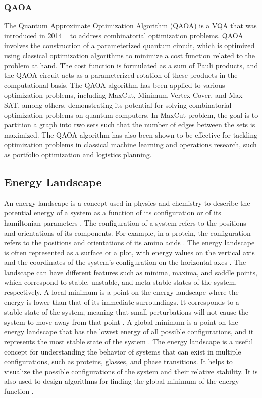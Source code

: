 \subsubsection{QAOA}
The Quantum Approximate Optimization Algorithm (QAOA) is a VQA that was introduced in 2014 ~\cite{farhi2014quantum} to address combinatorial optimization problems.
QAOA involves the construction of a parameterized quantum circuit, which is optimized using
classical optimization algorithms to minimize a cost function related to the problem at hand.
The cost function is formulated as a sum of Pauli products, and the QAOA circuit acts as a parameterized
rotation of these products in the computational basis. The QAOA algorithm has been applied to various
optimization problems, including MaxCut, Minimum Vertex Cover, and Max-SAT, among others, demonstrating
its potential for solving combinatorial optimization problems on quantum computers.
In MaxCut problem, the goal is to partition a graph into
two sets such that the number of edges between the sets is maximized.
The QAOA algorithm has also been shown to be effective for tackling optimization problems in classical
machine learning and operations research, such as portfolio optimization and logistics planning.


\subsection{Energy Landscape}\label{subsec:energy-landscape}
An energy landscape is a concept used in physics and chemistry to describe the potential energy of a system as a function
of its configuration or of its hamiltonian parameters \cite{wales2003energy}. The configuration of a system refers to the positions and orientations of
its components. For example, in a protein, the configuration refers to the positions and orientations of its amino
acids \cite{dill2012protein}. The energy landscape is often represented as a surface or a plot, with energy values on
the vertical axis and the coordinates of the system's configuration on the horizontal axes \cite{wales2003energy}.
The landscape can have different features such as minima, maxima, and saddle points, which correspond to stable,
unstable, and meta-stable states of the system, respectively. A local minimum is a point on the energy landscape where
the energy is lower than that of its immediate surroundings. It corresponds to a stable state of the system,
meaning that small perturbations will not cause the system to move away from that point \cite{wales2003energy}.
A global minimum is a point on the energy landscape that has the lowest energy of all possible configurations,
and it represents the most stable state of the system \cite{wales2003energy}. The energy landscape is a useful concept
for understanding the behavior of systems that can exist in multiple configurations, such as proteins, glasses,
and phase transitions. It helps to visualize the possible configurations of the system and their relative stability.
It is also used to design algorithms for finding the global minimum of the energy function \cite{wales1997global}.

